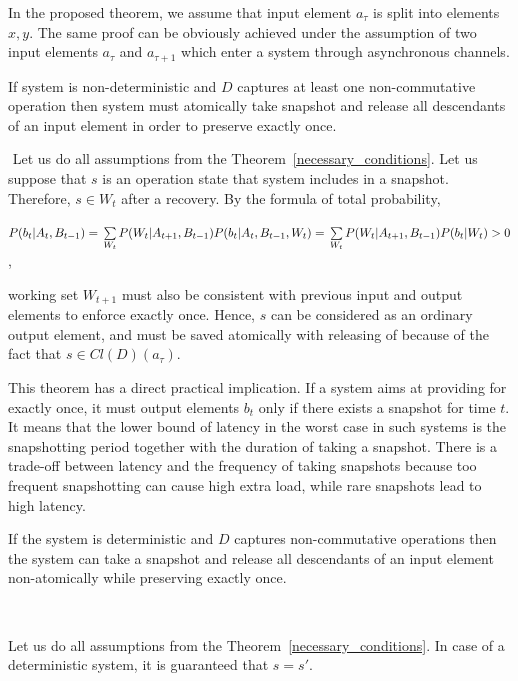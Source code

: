 In the proposed theorem, we assume that input element $a_\tau$ is split into elements $x,y$. The same proof can be obviously achieved under the assumption of two input elements $a_\tau$ and $a_{\tau+1}$ which enter a system through asynchronous channels.

\begin{corollary}
If system is non-deterministic and $D$ captures at least one non-commutative operation then system must atomically take snapshot and release all descendants of an input element in order to preserve exactly once.
\end{corollary}
\begin{sketch}
$ $\newline
Let us do all assumptions from the Theorem~\ref{necessary_conditions}. Let us suppose that $s$ is an operation state that system includes in a snapshot. Therefore, $s \in W_t$ after a recovery. By the formula of total probability,

$P(b_{t}|A_{t},B_{t-1})=\\
\sum\limits_{W_{t}}P(W_{t}|A_{t+1},B_{t-1})P(b_{t}|A_{t},B_{t-1},W_{t})=\\
\sum\limits_{W_{t}}P(W_{t}|A_{t+1},B_{t-1})P(b_{t}|W_{t}) > 0
$,

working set $W_{t+1}$ must also be consistent with previous input and output elements to enforce exactly once. Hence, $s$ can be considered as an ordinary output element, and must be saved atomically with releasing of  because of the fact that $s\in Cl(D)(a_\tau)$.
\end{sketch}

This theorem has a direct practical implication. If a system aims at providing for exactly once, it must output elements $b_t$ only if there exists a snapshot for time $t$. It means that the lower bound of latency in the worst case in such systems is the snapshotting period together with the duration of taking a snapshot. There is a trade-off between latency and the frequency of taking snapshots because too frequent snapshotting can cause high extra load, while rare snapshots lead to high latency.

\begin{corollary}
If the system is deterministic and $D$ captures non-commutative operations then the system can take a snapshot and release all descendants of an input element non-atomically while preserving exactly once.
\end{corollary}
\begin{sketch}
$ $\newline

Let us do all assumptions from the Theorem~\ref{necessary_conditions}. In case of a deterministic system, it is guaranteed that $s=s'$. 
\end{sketch}

